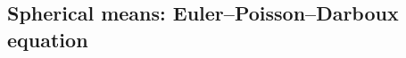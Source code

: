\documentclass[a4paper,9pt]{amsart}
\newcommand{\TODO}{{\bf\color{Red}TODO}}
\theoremstyle{plain}
\theoremstyle{definition}
\theoremstyle{remark}
\begin{document}

\subsection{Spherical means: Euler--Poisson--Darboux equation}\label{subs67cd4983}
\end{document}
